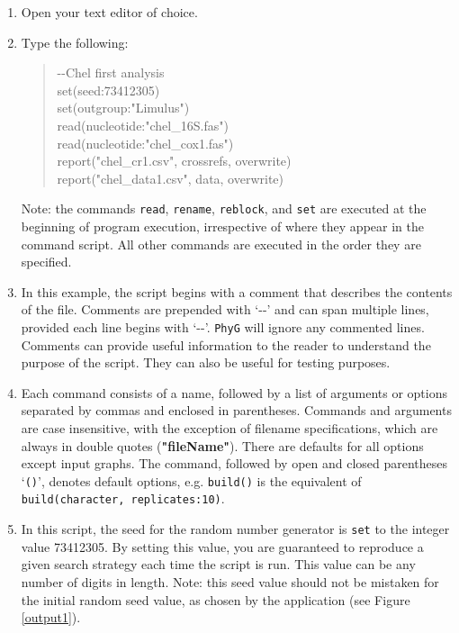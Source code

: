 \documentclass[]{article}
\newcommand{\phyg}{\texttt{PhyG} }
\begin{document}
\begin{enumerate}

\item Open your text editor of choice.

\item Type the following:
	
	\begin{quote}
	-\/-Chel first analysis\\
	set(seed:73412305)\\
	set(outgroup:"Limulus")\\
	read(nucleotide:"chel\_16S.fas")\\
	read(nucleotide:"chel\_cox1.fas")\\
	report("chel\_cr1.csv", crossrefs, overwrite)\\
	report("chel\_data1.csv", data, overwrite)\\
	\end{quote}

Note: the commands \texttt{read}, \texttt{rename}, \texttt{reblock}, and \texttt{set} 
are executed at the beginning of program execution, irrespective of where they 
appear in the command script. All other commands are executed in the order they 
are specified.

\item In this example, the script begins with a comment that describes the 
contents of the file. Comments are prepended with `-{}-' and can span multiple 
lines, provided each line begins with `-{}-'. \phyg will ignore any commented 
lines. Comments can provide useful information to the reader to understand 
the purpose of the script. They can also be useful for testing purposes.

\item Each command consists of a name, followed by a list of arguments or options 
separated by commas and enclosed in parentheses. Commands and arguments are 
case insensitive, with the exception of filename specifications, which are always in 
double quotes (\textbf{"fileName"}). There are defaults for all options except 
input graphs. The command, followed by open and closed parentheses `\texttt{()}',
denotes default options, e.g. \texttt{build()} is the equivalent of \texttt{build(character, 
replicates:10)}.

\item In this script, the seed for the random number generator is \texttt{set} to 
the integer value 73412305. By setting this value, you are guaranteed to reproduce 
a given search strategy each time the script is run. This value can be any number of 
digits in length. Note: this seed value should not be mistaken for the initial random
seed value, as chosen by the application (see Figure \ref{output1}).


\end{enumerate}
\end{document}
